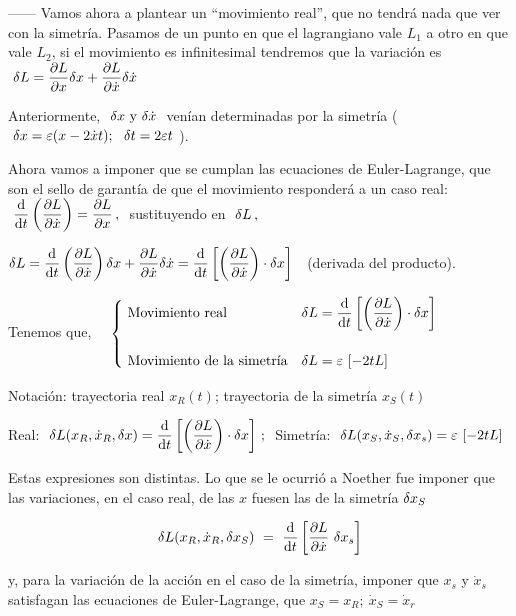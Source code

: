 \vspace{5mm} 

------ Vamos ahora a plantear un ``movimiento real'', que no tendrá nada que ver con la simetría. Pasamos de un punto en que el lagrangiano vale $L_1$ a otro en que vale $L_2$, si el movimiento es infinitesimal tendremos que la variación es $\ \var L=\displaystyle \pdv{L}{x} \var x + \pdv{L}{\dot x} \var \dot x$

Anteriormente, $\ \var x \text{ y } \var \dot x \ $ venían determinadas por la simetría \textcolor{gris}{($\ \var x=\varepsilon (x-2\dot x t);\ \ \var t=2\varepsilon t \ $)}.

Ahora vamos a imponer que se cumplan las ecuaciones de Euler-Lagrange, que son el sello de garantía de que el movimiento responderá a un caso real: $\ \displaystyle \dv{t} \left( \pdv{L}{\dot x} \right) = \pdv{L}{x}\, , \ $ sustituyendo en $\ \var L\, ,$

$\var L = \displaystyle \dv{t} \left( \pdv{L}{\dot x} \right) \var x + \pdv{L}{\dot x} \var \dot x = \dv{t} \left[  \left( \pdv{L}{\dot x} \right)\cdot \var x \right]\ \ $  \textcolor{gris}{(derivada del producto).}

Tenemos que, $\quad \begin{cases}
 \ \text{Movimiento real} & \displaystyle \var L = \dv{t} \left[  \left( \pdv{L}{\dot x} \right)\cdot \var x \right] \\ \\
 \ \text{Movimiento de la simetría} & \var L = \varepsilon \ [-2tL]
 \end{cases}$

Notación: trayectoria real $x_R(t)$; trayectoria de la simetría $x_S(t)$

Real: $\ \displaystyle \var L(x_R, \dot x_R, \var x) = \dv{t} \left[  \left( \pdv{L}{\dot x} \right)\cdot \var x \right]\, ; \ $ Simetría: $\ \var L(x_S, \dot x_S, \var x_s) = \varepsilon \ [-2tL]$

Estas expresiones son distintas. Lo que se le ocurrió a Noether fue  imponer que las variaciones, en el caso real, de las $x$ fuesen las de la simetría $\var x_S$

\begin{equation}
\label{T10Noether1}
\var L(x_R,\dot x_R, \var x_S) \ = \ 	\dv{t} \left[ \pdv{L}{\dot x} \ \var x_s\right]
\end{equation}

y, para la variación de la acción en el caso de la simetría, imponer que $x_s$ y $\dot x_s$ satisfagan las ecuaciones de Euler-Lagrange, que $x_S=x_R;\ \dot x_S=\dot x_r$

